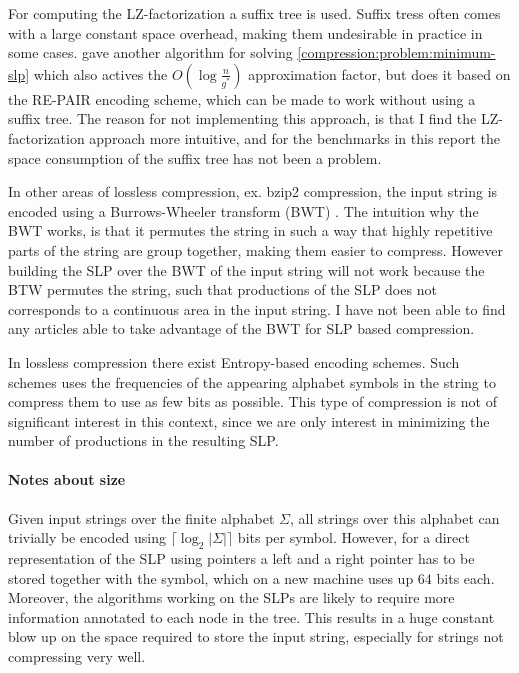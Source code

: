 \documentclass[twoside,11pt,openright]{report}
\newcommand{\ceil}[1] {\lceil #1 \rceil}
\begin{document}
For computing the LZ-factorization a suffix tree is used. Suffix tress often comes with a large constant space overhead, making them undesirable in practice in some cases. \cite{Sakamoto2005416} gave another algorithm for solving \cref{compression:problem:minimum-slp} which also actives the $O(\log{\frac{n}{g^*}})$ approximation factor, but does it based on the RE-PAIR encoding scheme, which can be made to work without using a suffix tree. The reason for not implementing this approach, is that I find the LZ-factorization approach more intuitive, and for the benchmarks in this report the space consumption of the suffix tree has not been a problem.

In other areas of lossless compression, ex. bzip2 compression, the input string is encoded using a Burrows-Wheeler transform (BWT) \cite{BurrowsWheeler}. The intuition why the BWT works, is that it permutes the string in such a way that highly repetitive parts of the string are group together, making them easier to compress. However building the SLP over the BWT of the input string will not work because the BTW permutes the string, such that productions of the SLP does not corresponds to a continuous area in the input string. I have not been able to find any articles able to take advantage of the BWT for SLP based compression.

In lossless compression there exist Entropy-based encoding schemes. Such schemes uses the frequencies of the appearing alphabet symbols in the string to compress them to use as few bits as possible. This type of compression is not of significant interest in this context, since we are only interest in minimizing the number of productions in the resulting SLP.

\paragraph{Notes about size}
Given input strings over the finite alphabet $\Sigma$, all strings over this alphabet can trivially be encoded using $\ceil{\log_2 |\Sigma|}$ bits per symbol. However, for a direct representation of the SLP using pointers a left and a right pointer has to be stored together with the symbol, which on a new machine uses up $64$ bits each. Moreover, the algorithms working on the SLPs are likely to require more information annotated to each node in the tree. This results in a huge constant blow up on the space required to store the input string, especially for strings not compressing very well.
\end{document}
